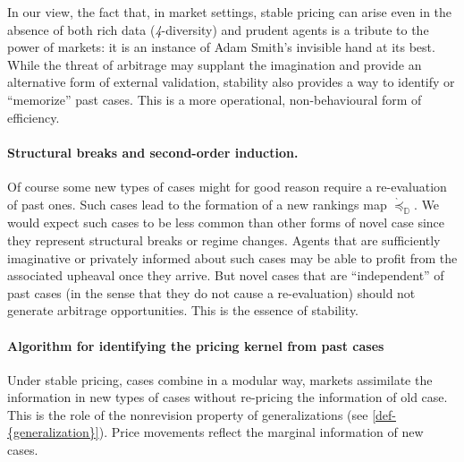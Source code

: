 \documentclass[12pt,a4paper,twoside]{article}
\newcommand{\mbbd}{{\mathds D}}
\newcommand{\fourdiv}{\textit{4}-\textup{diversity}}
\begin{document}
%

In our view, the fact that, in market settings, stable pricing can arise even
in the absence of both rich data (\fourdiv) and prudent agents is a tribute to
the power of markets: it is an instance of Adam Smith's invisible hand at its
best.  
While the threat of arbitrage may supplant the imagination and provide
an alternative form of external validation, stability also provides a way
to identify or ``memorize'' past cases.
This is a more operational, non-behavioural form of efficiency.

\paragraph{Structural breaks and second-order induction.} Of course some new
types of cases might for good reason require a re-evaluation of past ones.
Such cases lead to the formation of a new rankings map
$\grave{\preceq}_{\mbbd}$. We would expect such cases to be less common than
other forms of novel case since they represent structural breaks or regime
changes.  Agents that are sufficiently imaginative or privately informed about
such cases may be able to profit from the associated upheaval once they arrive.
But novel cases that are ``independent'' of past cases (in the sense that they
do not cause a re-evaluation) should not generate arbitrage opportunities.
This is the essence of stability.

\paragraph{Algorithm for identifying the pricing kernel from past cases} Under
stable pricing, cases combine in a modular way, markets assimilate the
information in new types of cases without re-pricing the information of old
case. This is the role of the nonrevision property of {generalization}s (see
\cref{def-{generalization}}).  Price movements reflect the marginal information
of new cases. 
\end{document}

